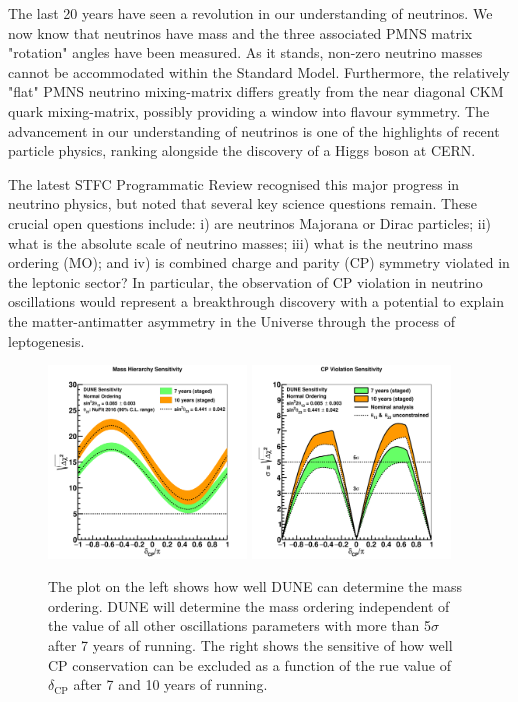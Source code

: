 The last 20 years have seen a revolution in our understanding of neutrinos. We now know that neutrinos have mass and the three associated PMNS matrix "rotation" angles have been measured. As it stands, non-zero neutrino masses cannot be accommodated within the Standard Model. Furthermore, the relatively "flat" PMNS neutrino mixing-matrix differs greatly from the near diagonal CKM quark mixing-matrix, possibly providing a window into flavour symmetry. The advancement in our understanding of neutrinos is one of the highlights of recent particle physics, ranking alongside the discovery of a Higgs boson at CERN. 

The latest STFC Programmatic Review recognised this major progress in neutrino physics, but noted that several key science questions remain. 
These crucial open questions include: i) are neutrinos Majorana or Dirac particles; ii) what is the absolute scale of neutrino masses; iii) what is the neutrino mass ordering (MO); and iv) is combined charge and parity (CP) symmetry violated in the leptonic sector? In particular, the observation of CP violation in neutrino oscillations would represent a breakthrough discovery with a potential to explain the matter-antimatter asymmetry in the Universe through the process of leptogenesis. 

\begin{figure}[ht]
    \centering
    \includegraphics[width=0.47\textwidth]{figs/mh_2017.png}
    \includegraphics[width=0.47\textwidth]{figs/cpv_2017.png}
    \caption{The plot on the left shows how well DUNE can determine the mass ordering. DUNE will determine the mass ordering independent of the value of all other oscillations parameters with more than 5$\sigma$ after 7 years of running. The right shows the sensitive of how well CP conservation can be excluded as a function of the rue value of $\delta_\text{CP}$ after 7 and 10 years of running.}
    \label{fig:physics}
\end{figure}
 
